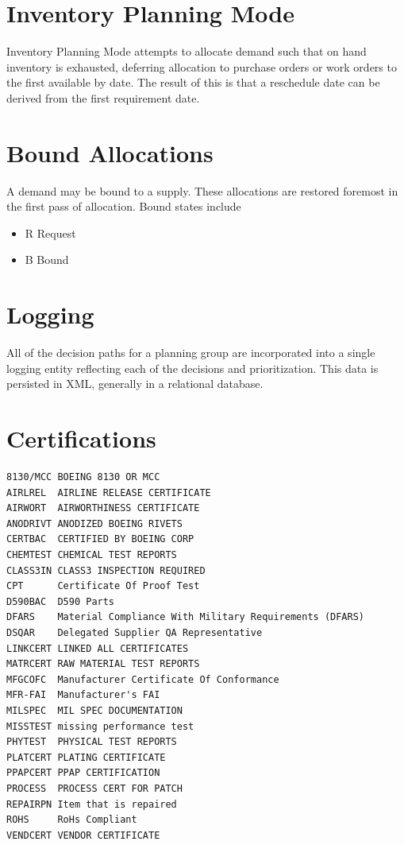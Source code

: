 \documentclass[letterpaper,10pt,english]{sphinxmanual}
\begin{document}
\section{Inventory Planning Mode}
\label{APS/ApsFeatures:inventory-planning-mode}
Inventory Planning Mode attempts to allocate demand such that on hand
inventory is exhausted, deferring allocation to purchase orders or work
orders to the first available by date. The result of this is that a
reschedule date can be derived from the first requirement date.


\section{Bound Allocations}
\label{APS/ApsFeatures:id31}
A demand may be bound to a supply. These allocations are restored
foremost in the first pass of allocation. Bound states include
\begin{itemize}
\item {} 
R Request

\item {} 
B Bound

\end{itemize}


\section{Logging}
\label{APS/ApsFeatures:logging}
All of the decision paths for a planning group are incorporated into a
single logging entity reflecting each of the decisions and
prioritization. This data is persisted in XML, generally in a relational
database.


\section{Certifications}
\label{APS/ApsFeatures:id32}
\begin{Verbatim}[commandchars=\\\{\}]
8130/MCC BOEING 8130 OR MCC
AIRLREL  AIRLINE RELEASE CERTIFICATE
AIRWORT  AIRWORTHINESS CERTIFICATE
ANODRIVT ANODIZED BOEING RIVETS
CERTBAC  CERTIFIED BY BOEING CORP
CHEMTEST CHEMICAL TEST REPORTS
CLASS3IN CLASS3 INSPECTION REQUIRED
CPT      Certificate Of Proof Test
D590BAC  D590 Parts
DFARS    Material Compliance With Military Requirements (DFARS)
DSQAR    Delegated Supplier QA Representative
LINKCERT LINKED ALL CERTIFICATES
MATRCERT RAW MATERIAL TEST REPORTS
MFGCOFC  Manufacturer Certificate Of Conformance
MFR-FAI  Manufacturer's FAI
MILSPEC  MIL SPEC DOCUMENTATION
MISSTEST missing performance test
PHYTEST  PHYSICAL TEST REPORTS
PLATCERT PLATING CERTIFICATE
PPAPCERT PPAP CERTIFICATION
PROCESS  PROCESS CERT FOR PATCH
REPAIRPN Item that is repaired
ROHS     RoHs Compliant
VENDCERT VENDOR CERTIFICATE
\end{Verbatim}
\end{document}
